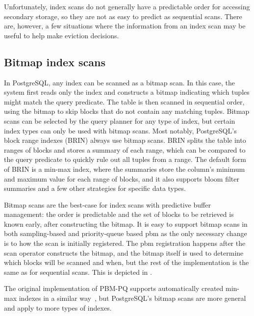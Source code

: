 Unfortunately, index scans do not generally have a predictable order for accessing secondary storage, so they are not as easy to predict as sequential scans. There are, however, a few situations where the information from an index scan may be useful to help make eviction decisions.

\subsection{\label{sec:bitmap_scans}Bitmap index scans}

In PostgreSQL, any index can be scanned as a bitmap scan. In this case, the system first reads only the index and constructs a bitmap indicating which tuples might match the query predicate. The table is then scanned in sequential order, using the bitmap to skip blocks that do not contain any matching tuples. Bitmap scans can be selected by the query planner for any type of index, but certain index types can only be used with bitmap scans. Most notably, PostgreSQL's block range indexes (BRIN) always use bitmap scans. BRIN splits the table into ranges of blocks and stores a summary of each range, which can be compared to the query predicate to quickly rule out all tuples from a range. The default form of BRIN is a min-max index, where the summaries store the column's minimum and maximum value for each range of blocks, and it also supports bloom filter summaries and a few other strategies for specific data types.

Bitmap scans are the best-case for index scans with predictive buffer management: the order is predictable and the set of blocks to be retrieved is known early, after constructing the bitmap. It is easy to support bitmap scans in both sampling-based and priority-queue based \gls{pbm} as the only necessary change is to how the scan is initially registered. The \gls{pbm} registration happens after the scan operator constructs the bitmap, and the bitmap itself is used to determine which blocks will be scanned and when, but the rest of the implementation is the same as for sequential scans. This is depicted in .

The original implementation of PBM-PQ supports automatically created min-max indexes in a similar way~\cite{pbm}, but PostgreSQL's bitmap scans are more general and apply to more types of indexes.

